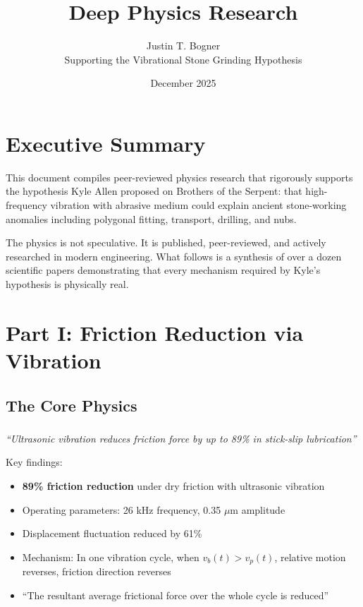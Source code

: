 \documentclass[11pt]{article}
\title{Deep Physics Research}
\author{Justin T. Bogner\\[0.5em]\small Supporting the Vibrational Stone Grinding Hypothesis}
\date{December 2025}
\begin{document}
\maketitle
\thispagestyle{empty}

\section*{Executive Summary}

This document compiles peer-reviewed physics research that rigorously supports the hypothesis Kyle Allen proposed on Brothers of the Serpent: that high-frequency vibration with abrasive medium could explain ancient stone-working anomalies including polygonal fitting, transport, drilling, and nubs.

The physics is not speculative. It is published, peer-reviewed, and actively researched in modern engineering. What follows is a synthesis of over a dozen scientific papers demonstrating that every mechanism required by Kyle's hypothesis is physically real.

\tableofcontents
\newpage

\section{Part I: Friction Reduction via Vibration}

\subsection{The Core Physics}

\subsubsection{\citet{Luo2024}}
\textit{``Ultrasonic vibration reduces friction force by up to 89\% in stick-slip lubrication''}

Key findings:
\begin{itemize}
    \item \textbf{89\% friction reduction} under dry friction with ultrasonic vibration
    \item Operating parameters: 26 kHz frequency, 0.35 $\mu$m amplitude
    \item Displacement fluctuation reduced by 61\%
    \item Mechanism: In one vibration cycle, when $v_b(t) > v_p(t)$, relative motion reverses, friction direction reverses
    \item ``The resultant average frictional force over the whole cycle is reduced''
\end{itemize}
\end{document}
